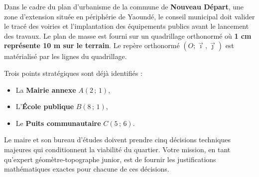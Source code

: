 \documentclass[11pt]{article}
\newcounter{popsec}
\newcounter{popsub}
\newcommand{\courssub}[1]{%
  \stepcounter{popsub}%
  \par\vspace{9pt}\noindent{\popxbold\fontsize{11.5}{13}\selectfont\color{popink}{\color{poporange}\thepopsec.\thepopsub}\hspace{6pt}#1}\par\nopagebreak\vspace{4pt}
}
\begin{document}
\courssub{Situation}
Dans le cadre du plan d'urbanisme de la commune de \textbf{Nouveau Départ}, une zone d'extension située en périphérie de Yaoundé, le conseil municipal doit valider le tracé des voiries et l'implantation des équipements publics avant le lancement des travaux. Le plan de masse est fourni sur un quadrillage orthonormé où \textbf{1 cm représente 10 m sur le terrain}. Le repère orthonormé $(O;\vec{\imath},\vec{\jmath})$ est matérialisé par les lignes du quadrillage.

Trois points stratégiques sont déjà identifiés :
\begin{itemize}
    \item La \textbf{Mairie annexe} $A(2\,;\,1)$,
    \item L'\textbf{École publique} $B(8\,;\,1)$,
    \item Le \textbf{Puits communautaire} $C(5\,;\,6)$.
\end{itemize}

Le maire et son bureau d'études doivent prendre cinq décisions techniques majeures qui conditionnent la viabilité du quartier. Votre mission, en tant qu'expert géomètre-topographe junior, est de fournir les justifications mathématiques exactes pour chacune de ces décisions.
\end{document}
